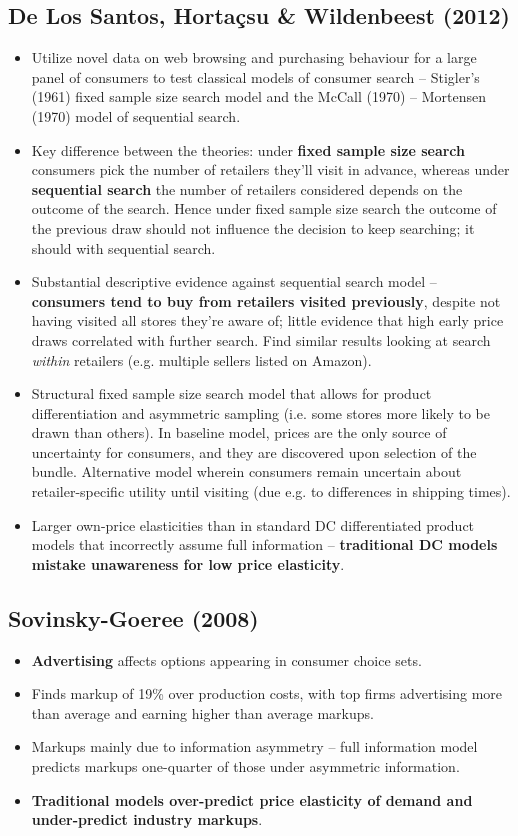 \documentclass[11pt]{article}
\numberwithin{equation}{section}
\begin{document}
	\subsection*{De Los Santos, Horta\c{c}su \& Wildenbeest (2012)}
	\begin{itemize}
		\item Utilize novel data on web browsing and purchasing behaviour for a large panel of consumers to test classical models of consumer search -- Stigler's (1961) fixed sample size search model and the McCall (1970) -- Mortensen (1970) model of sequential search.
		\item Key difference between the theories: under \textbf{fixed sample size search} consumers pick the number of retailers they'll visit in advance, whereas under \textbf{sequential search} the number of retailers considered depends on the outcome of the search. Hence under fixed sample size search the outcome of the previous draw should not influence the decision to keep searching; it should with sequential search.
		\item Substantial descriptive evidence against sequential search model -- \textbf{consumers tend to buy from retailers visited previously}, despite not having visited all stores they're aware of; little evidence that high early price draws correlated with further search. Find similar results looking at search \emph{within} retailers (e.g. multiple sellers listed on Amazon).
		\item Structural fixed sample size search model that allows for product differentiation and asymmetric sampling (i.e. some stores more likely to be drawn than others). In baseline model, prices are the only source of uncertainty for consumers, and they are discovered upon selection of the bundle. Alternative model wherein consumers remain uncertain about retailer-specific utility until visiting (due e.g. to differences in shipping times).
		\item Larger own-price elasticities than in standard DC differentiated product models that incorrectly assume full information -- \textbf{traditional DC models mistake unawareness for low price elasticity}.
	\end{itemize}
	\subsection*{Sovinsky-Goeree (2008)}
	\begin{itemize}
		\item \textbf{Advertising} affects options appearing in consumer choice sets.
		\item Finds markup of 19\% over production costs, with top firms advertising more than average and earning higher than average markups.
		\item Markups mainly due to information asymmetry -- full information model predicts markups one-quarter of those under asymmetric information.
		\item \textbf{Traditional models over-predict price elasticity of demand and under-predict industry markups}.
	\end{itemize}
\end{document}
